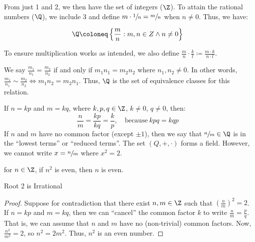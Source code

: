 \documentclass[12pt]{report}
\begin{document}
From just 1 and 2, we then have the set of integers ($\Z$). To attain the rational numbers ($\Q$), we include 3 and define $m \cdot \sfrac{1}{n} = \sfrac{m}{n}$ when $n \neq 0$. Thus, we have:

\[ \Q \coloneq \left\{ \frac{m}{n} : m,n \in Z \land n \neq 0 \right\} \]

To ensure multiplication works as intended, we also define $\frac{m}{n} \cdot \frac{k}{l} \coloneq \frac{m \cdot k}{n \cdot l}$.

We say $\frac{m_1}{n_1} = \frac{m_2}{n_2}$ if and only if $m_1n_1 = m_2n_2$ where $n_1, n_2 \neq 0$. In other words, $\frac{m_1}{n_1} \sim \frac{m_2}{n_2} \iff m_1n_2 = m_2n_1$. Thus, $\Q$ is the set of equivalence classes for this relation.

If $n = kp$ and $m = kq$, where $k,p,q \in \Z$, $k \neq 0$, $q \neq 0$, then:
\[ \frac{n}{m} = \frac{kp}{kq} = \frac{k}{p}, \quad \text{because}\ kpq = kqp \]
If $n$ and $m$ have no common factor (except $\pm 1$), then we say that $\sfrac{n}{m} \in \Q$ is in the ``lowest terms'' or ``reduced terms''. The set $(Q, +, \cdot)$ forms a field. However, we cannot write $x = \sfrac{n}{m}$ where $x^2 = 2$.

\begin{exbox}{}{}
    for $n \in \Z$, if $n^2$ is even, then $n$ is even.
\end{exbox}

\begin{thmbox}{Root 2 is Irrational}{}
    \begin{proof}
        Suppose for contradiction that there exist $n,m \in \Z$ such that $\left( \frac{n}{m} \right)^2 = 2$. If $n = kp$ and $m = kq$, then we can ``cancel'' the common factor $k$ to write $\frac{n}{m} = \frac{p}{q}$. That is, we can assume that $n$ and $m$ have no (non-trivial) common factors. Now, $\frac{n^2}{m^2} = 2$, so $n^2 = 2m^2$. Thus, $n^2$ is an even number.

    \end{proof}
\end{thmbox}

\amzindex
\end{document}
